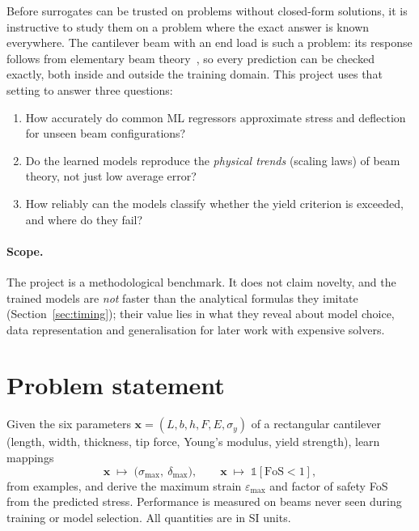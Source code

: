\documentclass[11pt,a4paper]{article}
\newcommand{\smax}{\sigma_{\max}}
\newcommand{\dmax}{\delta_{\max}}
\begin{document}
Before surrogates can be trusted on problems without closed-form solutions, it is instructive to study them on a
problem where the exact answer is known everywhere. The cantilever beam with an end load is such a problem: its
response follows from elementary beam theory~\cite{gere2013}, so every prediction can be checked exactly, both
inside and outside the training domain. This project uses that setting to answer three questions:
\begin{enumerate}
\item How accurately do common ML regressors approximate stress and deflection for unseen beam configurations?
\item Do the learned models reproduce the \emph{physical trends} (scaling laws) of beam theory, not just low average error?
\item How reliably can the models classify whether the yield criterion is exceeded, and where do they fail?
\end{enumerate}

\paragraph{Scope.} The project is a methodological benchmark. It does not claim novelty, and the trained models are
\emph{not} faster than the analytical formulas they imitate (Section~\ref{sec:timing}); their value lies in what they
reveal about model choice, data representation and generalisation for later work with expensive solvers.

\section{Problem statement}
Given the six parameters $\mathbf{x}=(L,b,h,F,E,\sigma_y)$ of a rectangular cantilever (length, width, thickness,
tip force, Young's modulus, yield strength), learn mappings
\begin{equation}
\mathbf{x}\;\mapsto\;\bigl(\smax,\ \dmax\bigr), \qquad \mathbf{x}\;\mapsto\;\mathbb{1}[\mathrm{FoS}<1],
\end{equation}
from examples, and derive the maximum strain $\varepsilon_{\max}$ and factor of safety FoS from the predicted stress.
Performance is measured on beams never seen during training or model selection. All quantities are in SI units.

\end{document}
